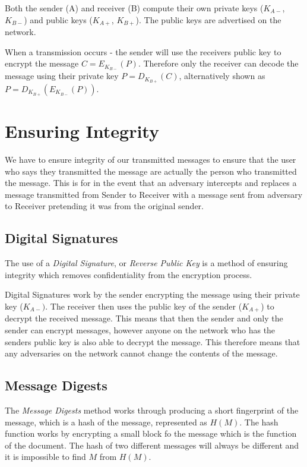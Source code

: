 Both the sender (A) and receiver (B) compute their own private keys ($K_{A-}$, $K_{B-}$) and public keys ($K_{A+}$, $K_{B+}$). The public keys are advertised on the network.

When a transmission occurs - the sender will use the receivers public key to encrypt the message $C=E_{K_{B-}}(P)$. Therefore only the receiver can decode the message using their private key $P=D_{K_{B+}}(C)$, alternatively shown as $P=D_{K_{B+}}(E_{K_{B-}}(P))$. 

\section{Ensuring Integrity}
We have to ensure integrity of our transmitted messages to ensure that the user who says they transmitted the message are actually the person who transmitted the message. This is for in the event that an adversary intercepts and replaces a message transmitted from Sender to Receiver with a message sent from adversary to Receiver pretending it was from the original sender.

\subsection{Digital Signatures}
The use of a \textit{Digital Signature}, or \textit{Reverse Public Key} is a method of ensuring integrity which removes confidentiality from the encryption process. 

Digital Signatures work by the sender encrypting the message using their private key ($K_{A-})$. The receiver then uses the public key of the sender ($K_{A+}$) to decrypt the received message. This means that then the sender and only the sender can encrypt messages, however anyone on the network who has the senders public key is also able to decrypt the message. This therefore means that any adversaries on the network cannot change the contents of the message.

\subsection{Message Digests}
The \textit{Message Digests} method works through producing a short fingerprint of the message, which is a hash of the message, represented as $H(M)$. The hash function works by encrypting a small block fo the message which is the function of the document. The hash of two different messages will always be different and it is impossible to find $M$ from $H(M)$.

